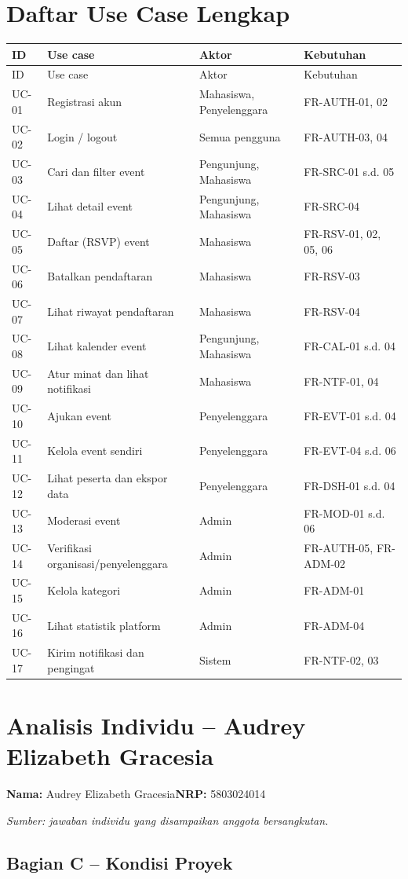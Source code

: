 \documentclass[11pt,a4paper]{article}
\newcommand{\page}[1]{\clearpage\section{#1}}
\begin{document}
\page{Daftar Use Case Lengkap}
\small\begin{longtable}{p{1.3cm}p{4.1cm}p{3.5cm}p{4.7cm}}
\toprule ID & Use case & Aktor & Kebutuhan\\\midrule\endfirsthead
\toprule ID & Use case & Aktor & Kebutuhan\\\midrule\endhead\bottomrule\endfoot
UC-01 & Registrasi akun & Mahasiswa, Penyelenggara & FR-AUTH-01, 02\\
UC-02 & Login / logout & Semua pengguna & FR-AUTH-03, 04\\
UC-03 & Cari dan filter event & Pengunjung, Mahasiswa & FR-SRC-01 s.d. 05\\
UC-04 & Lihat detail event & Pengunjung, Mahasiswa & FR-SRC-04\\
UC-05 & Daftar (RSVP) event & Mahasiswa & FR-RSV-01, 02, 05, 06\\
UC-06 & Batalkan pendaftaran & Mahasiswa & FR-RSV-03\\
UC-07 & Lihat riwayat pendaftaran & Mahasiswa & FR-RSV-04\\
UC-08 & Lihat kalender event & Pengunjung, Mahasiswa & FR-CAL-01 s.d. 04\\
UC-09 & Atur minat dan lihat notifikasi & Mahasiswa & FR-NTF-01, 04\\
UC-10 & Ajukan event & Penyelenggara & FR-EVT-01 s.d. 04\\
UC-11 & Kelola event sendiri & Penyelenggara & FR-EVT-04 s.d. 06\\
UC-12 & Lihat peserta dan ekspor data & Penyelenggara & FR-DSH-01 s.d. 04\\
UC-13 & Moderasi event & Admin & FR-MOD-01 s.d. 06\\
UC-14 & Verifikasi organisasi/penyelenggara & Admin & FR-AUTH-05, FR-ADM-02\\
UC-15 & Kelola kategori & Admin & FR-ADM-01\\
UC-16 & Lihat statistik platform & Admin & FR-ADM-04\\
UC-17 & Kirim notifikasi dan pengingat & Sistem & FR-NTF-02, 03\\
\end{longtable}\normalsize

\page{Analisis Individu -- Audrey Elizabeth Gracesia}
\textbf{Nama:} Audrey Elizabeth Gracesia\quad\textbf{NRP:} 5803024014

\textit{Sumber: jawaban individu yang disampaikan anggota bersangkutan.} \cite{audreyind}

\subsection*{Bagian C -- Kondisi Proyek}
\end{document}
